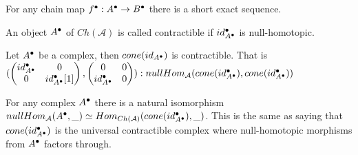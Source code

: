     \begin{remark}
        For any chain map $f^{\bullet}:A^{\bullet}\rightarrow B^{\bullet}$ there is a short exact sequence.
        \begin{center}
        \end{center}
    \end{remark}

    \begin{definition}
        An object $A^{\bullet}$ of $Ch(\mathcal{A})$ is called contractible if $id_{A^{\bullet}}^{\bullet}$ is null-homotopic.
    \end{definition}

    \begin{example}
        Let $A^{\bullet}$ be a complex, then $cone(id_{A^{\bullet}})$ is contractible. That is \\$(\begin{pmatrix} id_{A^{\bullet}}^{\bullet} & 0 \\ 0 & id_{A^{\bullet}}^{\bullet}[1]\end{pmatrix},\begin{pmatrix} 0 & 0 \\ id_{A^{\bullet}}^{\bullet} & 0 \end{pmatrix}):nullHom_{\mathcal{A}}(cone(id_{A^{\bullet}}^{\bullet}), cone(id_{A^{\bullet}}^{\bullet}))$
    \end{example}

    \begin{prop}
        For any complex $A^{\bullet}$ there is a natural isomorphism $nullHom_{\mathcal{A}}(A^{\bullet},\_)\simeq Hom_{Ch(\mathcal{A})}(cone(id_{A^{\bullet}}^{\bullet}),\_)$. This is the same as saying that $cone(id_{A^{\bullet}}^{\bullet})$ is the universal contractible complex where null-homotopic morphisms from $A^{\bullet}$ factors through.
    \end{prop}

